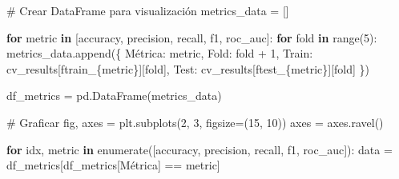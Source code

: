 \documentclass[
  doc,
  floatsintext,
  longtable,
  a4paper,
  nolmodern,
  notxfonts,
  notimes,
  12pt,
  colorlinks=true,linkcolor=blue,citecolor=blue,urlcolor=blue]{apa7}
\newenvironment{Shaded}{\begin{snugshade}}{\end{snugshade}}
\newcommand{\BuiltInTok}[1]{\textcolor[rgb]{0.00,0.23,0.31}{#1}}
\newcommand{\CommentTok}[1]{\textcolor[rgb]{0.37,0.37,0.37}{#1}}
\newcommand{\ControlFlowTok}[1]{\textcolor[rgb]{0.00,0.23,0.31}{\textbf{#1}}}
\newcommand{\DecValTok}[1]{\textcolor[rgb]{0.68,0.00,0.00}{#1}}
\newcommand{\KeywordTok}[1]{\textcolor[rgb]{0.00,0.23,0.31}{\textbf{#1}}}
\newcommand{\NormalTok}[1]{\textcolor[rgb]{0.00,0.23,0.31}{#1}}
\newcommand{\OperatorTok}[1]{\textcolor[rgb]{0.37,0.37,0.37}{#1}}
\newcommand{\SpecialCharTok}[1]{\textcolor[rgb]{0.37,0.37,0.37}{#1}}
\newcommand{\SpecialStringTok}[1]{\textcolor[rgb]{0.13,0.47,0.30}{#1}}
\newcommand{\StringTok}[1]{\textcolor[rgb]{0.13,0.47,0.30}{#1}}
\begin{document}
\begin{Shaded}
\begin{Highlighting}[]
\CommentTok{\# Crear DataFrame para visualización}
\NormalTok{metrics\_data }\OperatorTok{=}\NormalTok{ []}

\ControlFlowTok{for}\NormalTok{ metric }\KeywordTok{in}\NormalTok{ [}\StringTok{\textquotesingle{}accuracy\textquotesingle{}}\NormalTok{, }\StringTok{\textquotesingle{}precision\textquotesingle{}}\NormalTok{, }\StringTok{\textquotesingle{}recall\textquotesingle{}}\NormalTok{, }\StringTok{\textquotesingle{}f1\textquotesingle{}}\NormalTok{, }\StringTok{\textquotesingle{}roc\_auc\textquotesingle{}}\NormalTok{]:}
    \ControlFlowTok{for}\NormalTok{ fold }\KeywordTok{in} \BuiltInTok{range}\NormalTok{(}\DecValTok{5}\NormalTok{):}
\NormalTok{        metrics\_data.append(\{}
            \StringTok{\textquotesingle{}Métrica\textquotesingle{}}\NormalTok{: metric,}
            \StringTok{\textquotesingle{}Fold\textquotesingle{}}\NormalTok{: fold }\OperatorTok{+} \DecValTok{1}\NormalTok{,}
            \StringTok{\textquotesingle{}Train\textquotesingle{}}\NormalTok{: cv\_results[}\SpecialStringTok{f\textquotesingle{}train\_}\SpecialCharTok{\{}\NormalTok{metric}\SpecialCharTok{\}}\SpecialStringTok{\textquotesingle{}}\NormalTok{][fold],}
            \StringTok{\textquotesingle{}Test\textquotesingle{}}\NormalTok{: cv\_results[}\SpecialStringTok{f\textquotesingle{}test\_}\SpecialCharTok{\{}\NormalTok{metric}\SpecialCharTok{\}}\SpecialStringTok{\textquotesingle{}}\NormalTok{][fold]}
\NormalTok{        \})}

\NormalTok{df\_metrics }\OperatorTok{=}\NormalTok{ pd.DataFrame(metrics\_data)}

\CommentTok{\# Graficar}
\NormalTok{fig, axes }\OperatorTok{=}\NormalTok{ plt.subplots(}\DecValTok{2}\NormalTok{, }\DecValTok{3}\NormalTok{, figsize}\OperatorTok{=}\NormalTok{(}\DecValTok{15}\NormalTok{, }\DecValTok{10}\NormalTok{))}
\NormalTok{axes }\OperatorTok{=}\NormalTok{ axes.ravel()}

\ControlFlowTok{for}\NormalTok{ idx, metric }\KeywordTok{in} \BuiltInTok{enumerate}\NormalTok{([}\StringTok{\textquotesingle{}accuracy\textquotesingle{}}\NormalTok{, }\StringTok{\textquotesingle{}precision\textquotesingle{}}\NormalTok{, }\StringTok{\textquotesingle{}recall\textquotesingle{}}\NormalTok{, }\StringTok{\textquotesingle{}f1\textquotesingle{}}\NormalTok{, }\StringTok{\textquotesingle{}roc\_auc\textquotesingle{}}\NormalTok{]):}
\NormalTok{    data }\OperatorTok{=}\NormalTok{ df\_metrics[df\_metrics[}\StringTok{\textquotesingle{}Métrica\textquotesingle{}}\NormalTok{] }\OperatorTok{==}\NormalTok{ metric]}
    

\end{Highlighting}
\end{Shaded}
\end{document}
